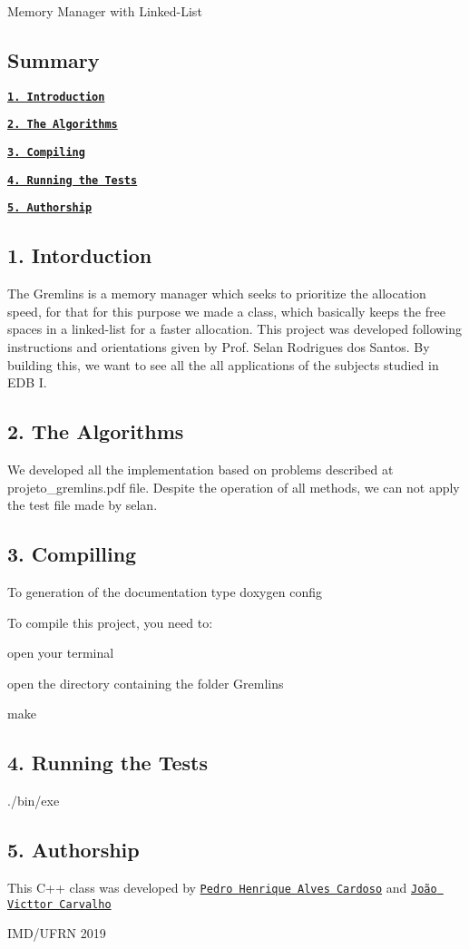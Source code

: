 Memory Manager with Linked-\/\+List

\subsection*{Summary}

{\bfseries \href{#1-introduction}{\tt 1. Introduction}}

{\bfseries \href{#2-the-algorithms}{\tt 2. The Algorithms}}

{\bfseries \href{#3-compiling}{\tt 3. Compiling}}

{\bfseries \href{#4-running-the-tests}{\tt 4. Running the Tests}}

{\bfseries \href{#5-authorship}{\tt 5. Authorship}}

\subsection*{1. Intorduction}

The Gremlins is a memory manager which seeks to prioritize the allocation speed, for that for this purpose we made a class, which basically keeps the free spaces in a linked-\/list for a faster allocation. This project was developed following instructions and orientations given by Prof. Selan Rodrigues dos Santos. By building this, we want to see all the all applications of the subjects studied in E\+DB I.

\subsection*{2. The Algorithms}

We developed all the implementation based on problems described at {\ttfamily projeto\+\_\+gremlins.\+pdf} file. Despite the operation of all methods, we can not apply the test file made by selan.

\subsection*{3. Compilling}

To generation of the documentation type {\ttfamily doxygen config}

To compile this project, you need to\+:

{\ttfamily open your terminal}

{\ttfamily open the directory containing the folder Gremlins}

{\ttfamily make}

\subsection*{4. Running the Tests}

{\ttfamily ./bin/exe}

\subsection*{5. Authorship}

This C++ class was developed by \href{https://github.com/pedrocardoso5}{\tt Pedro Henrique Alves Cardoso} and \href{https://github.com/carvs10}{\tt João Victtor Carvalho}

I\+M\+D/\+U\+F\+RN 2019 